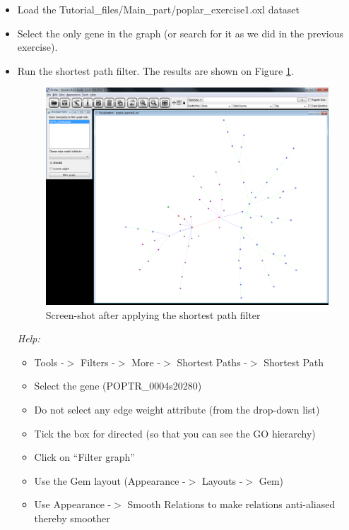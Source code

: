 \begin{itemize}
\item Load the Tutorial\_files/Main\_part/poplar\_exercise1.oxl dataset
\item Select the only gene in the graph (or search for it as we did in the previous exercise).
\item Run the shortest path filter. The results are shown on Figure \ref{fig:poplar_result_shortestpath}. 
\begin{figure}[H]
\centering
\includegraphics[scale=0.3]{images/Jun12/poplar_result_ex2_shortestpath.png} 
\caption{Screen-shot after applying the shortest path filter}
\label{fig:poplar_result_shortestpath}
\end{figure}

\emph{Help:}
	\begin{itemize}
	\item Tools -$>$ Filters -$>$ More -$>$ Shortest Paths -$>$ Shortest Path
	\item Select the gene (POPTR\_0004s20280)
	\item Do not select any edge weight attribute (from the drop-down list)
	\item Tick the box for directed (so that you can see the GO hierarchy)
	\item Click on ``Filter graph''
	\item Use the Gem layout (Appearance -$>$ Layouts -$>$ Gem)
	\item Use Appearance -$>$ Smooth Relations to make relations anti-aliased thereby smoother
	\end{itemize}


\end{itemize}
